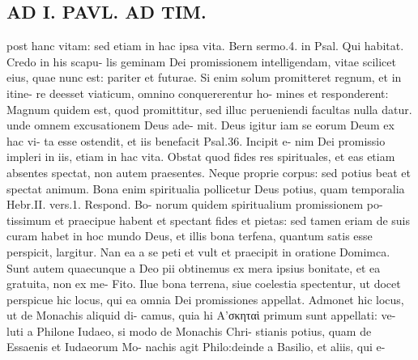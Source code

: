 \documentclass{article}
\begin{document}
\begin{pages}
\section*{AD I. PAVL. AD TIM. }
\marginpar{[ p.212 ]}post hanc vitam: sed etiam in hac ipsa vita. Bern sermo.4. in Psal. Qui habitat. Credo in his scapu- lis geminam Dei promissionem intelligendam, vitae scilicet eius, quae nunc est: pariter et futurae. Si enim solum promitteret regnum, et in itine- re deesset viaticum, omnino conquererentur ho- mines et responderent: Magnum quidem est, quod promittitur, sed illuc perueniendi facultas nulla datur. unde omnem excusationem Deus ade- mit. Deus igitur iam se eorum Deum ex hac vi- ta esse ostendit, et iis benefacit Psal.36. Incipit e- nim Dei promissio impleri in iis, etiam in hac vita. Obstat quod fides res spirituales, et eas etiam absentes spectat, non autem praesentes. Neque proprie corpus: sed potius beat et spectat animum. Bona enim spiritualia pollicetur Deus potius, quam temporalia Hebr.II. vers.1. Respond. Bo- norum quidem spiritualium promissionem po- tissimum et praecipue habent et spectant fides et pietas: sed tamen eriam de suis curam habet in hoc mundo Deus, et illis bona terfena, quantum satis esse perspicit, largitur. Nan ea a se peti et vult et praecipit in oratione Domimca. Sunt autem quaecunque a Deo pii obtinemus ex mera ipsius bonitate, et ea gratuita, non ex me- Fito. Ilue bona terrena, siue coelestia spectentur, ut docet perspicue hic locus, qui ea omnia Dei promissiones appellat. Admonet hic locus, ut de Monachis aliquid di- camus, quia hi Α'σκηταὶ primum sunt appellati: ve- luti a Philone Iudaeo, si modo de Monachis Chri- stianis potius, quam de Essaenis et Iudaeorum Mo- nachis agit Philo:deinde a Basilio, et aliis, qui e- 

\end{pages}
\end{document}
